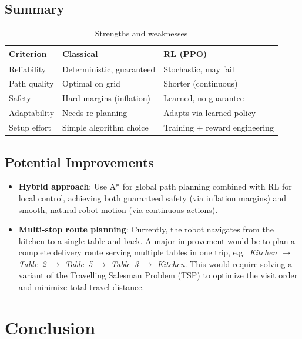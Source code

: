 \documentclass[12pt, a4paper]{article}
\begin{document}
\subsection{Summary}

\begin{table}[H]
\centering
{}
\caption{Strengths and weaknesses}
\begin{tabular}{p{3cm}p{5cm}p{5cm}}
\toprule
\textbf{Criterion} & \textbf{Classical} & \textbf{RL (PPO)} \\
\midrule
Reliability & Deterministic, guaranteed & Stochastic, may fail \\
Path quality & Optimal on grid & Shorter (continuous) \\
Safety & Hard margins (inflation) & Learned, no guarantee \\
Adaptability & Needs re-planning & Adapts via learned policy \\
Setup effort & Simple algorithm choice & Training + reward engineering \\
\bottomrule
\end{tabular}
\end{table}

\subsection{Potential Improvements}
\begin{itemize}
  \item \textbf{Hybrid approach}: Use A* for global path planning combined with RL for local control, achieving both guaranteed safety (via inflation margins) and smooth, natural robot motion (via continuous actions).
  \item \textbf{Multi-stop route planning}: Currently, the robot navigates from the kitchen to a single table and back. A major improvement would be to plan a complete delivery route serving multiple tables in one trip, e.g.\ \textit{Kitchen $\rightarrow$ Table~2 $\rightarrow$ Table~5 $\rightarrow$ Table~3 $\rightarrow$ Kitchen}. This would require solving a variant of the Travelling Salesman Problem (TSP) to optimize the visit order and minimize total travel distance.
\end{itemize}

\section{Conclusion}
\end{document}
